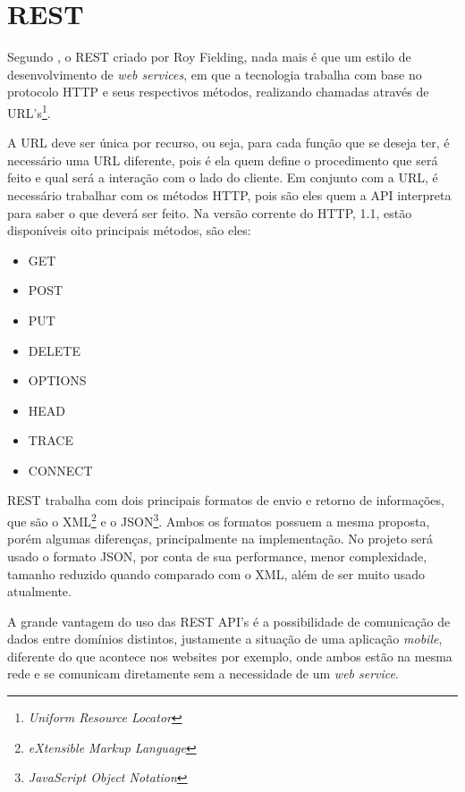 \section{REST}
	\par Segundo , o REST criado por Roy Fielding, nada mais é que um estilo de desenvolvimento de \textit{web services}, em que a tecnologia trabalha com base no protocolo HTTP e seus respectivos métodos, realizando chamadas através de URL's\footnote{\textit{Uniform Resource Locator}}. 
	\par A URL deve ser única por recurso, ou seja, para cada função que se deseja ter, é necessário uma URL diferente, pois é ela quem define o procedimento que será feito e qual será a interação com o lado do cliente. Em conjunto com a URL, é necessário trabalhar com os métodos HTTP, pois são eles quem a API interpreta para saber o que deverá ser feito. Na versão corrente do HTTP, 1.1, estão disponíveis oito principais métodos, são eles:
	\begin{itemize}
	 	\item GET
	 	\item POST
	 	\item PUT
	 	\item DELETE
	 	\item OPTIONS
	 	\item HEAD
	 	\item TRACE
	   	\item CONNECT
	\end{itemize}
	\par REST trabalha com dois principais formatos de envio e retorno de informações, que são o XML\footnote{\textit{eXtensible Markup Language}} e o JSON\footnote{\textit{JavaScript Object Notation}}. Ambos os formatos possuem a mesma proposta, porém algumas diferenças, principalmente na implementação. No projeto será usado o formato JSON, por conta de sua performance, menor complexidade, tamanho reduzido quando comparado com o XML, além de ser muito usado atualmente.
	\par A grande vantagem do uso das REST API's é a possibilidade de comunicação de dados entre domínios distintos, justamente a situação de uma aplicação \textit{mobile}, diferente do que acontece nos websites por exemplo, onde ambos estão na mesma rede e se comunicam diretamente sem a necessidade de um \textit{web service}.


